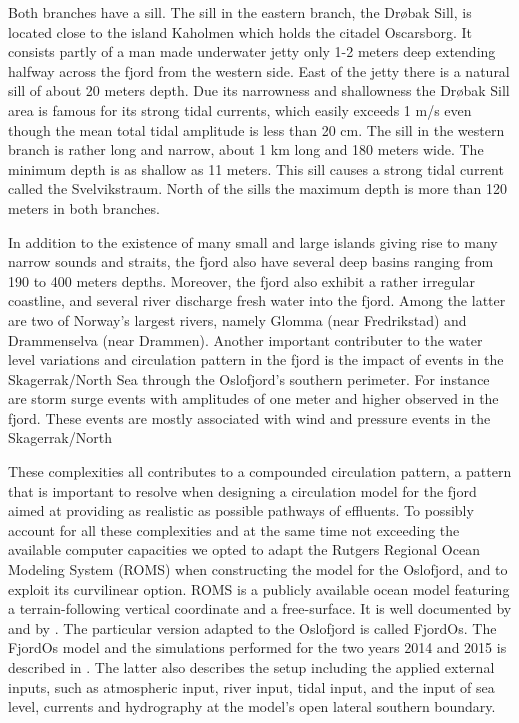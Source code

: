 Both branches have a sill. The sill in the eastern branch, the Dr{\o}bak Sill, is located close to the island Kaholmen which holds the citadel Oscarsborg. It consists partly of a man made underwater jetty only 1-2 meters deep extending halfway across the fjord from the western side. East of the jetty there is a natural sill of about 20 meters depth. Due its narrowness and shallowness the Dr{\o}bak Sill area is famous for its strong tidal currents, which easily exceeds 1 m/s even though the mean total tidal amplitude is less than 20 cm. 
The sill in the western branch is rather long and narrow, about 1 km long and 180 meters wide. The minimum depth is as shallow as 11 meters. This sill causes a strong tidal current called the Svelvikstraum.
North of the sills the maximum depth is more than 120 meters in both branches. 

In addition to the existence of many small and large islands giving rise to many narrow sounds and straits, the fjord also have several deep basins ranging from 190 to 400 meters depths. Moreover, the fjord also exhibit a rather irregular coastline, and several river discharge fresh water into the fjord. Among the latter are two of Norway's largest rivers, namely Glomma (near Fredrikstad) and Drammenselva (near Drammen). Another important contributer to the water level variations and circulation pattern in the fjord is the impact of events in the Skagerrak/North Sea through the Oslofjord's southern perimeter. For instance are storm surge events with amplitudes of one meter and higher observed in the fjord. These events are mostly associated with wind and pressure events in the Skagerrak/North

These complexities all contributes to a compounded circulation pattern, a pattern that is important to resolve when designing a circulation model for the fjord aimed at providing as realistic as possible pathways of effluents. To possibly account for all these complexities and at the same time not exceeding the available computer capacities we opted to adapt the Rutgers Regional Ocean Modeling System (ROMS) when constructing the model for the Oslofjord, and to exploit its curvilinear option. ROMS is a publicly available ocean model featuring a terrain-following vertical coordinate and a free-surface. It is well documented by \cite{haidv:etal:2008} and by \cite{shche:mcwil:2003,shche:mcwil:2005,shche:mcwil:2009}. The particular version adapted to the Oslofjord is called FjordOs. The FjordOs model and the simulations performed for the two years 2014 and 2015 is described in \cite{roed:etal:2016}. The latter also describes the setup including the applied external inputs, such as atmospheric input, river input, tidal input, and the input of sea level, currents and hydrography at the model's open lateral southern boundary.


\clearpage
